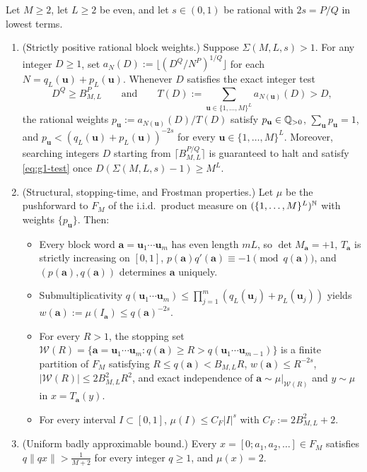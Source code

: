 \documentclass[11pt]{article}
\newcommand{\dist}[1]{\lVert #1\rVert}
\begin{document}
\begin{lemma}\label{lem:block-measure}
Let $M\ge2$, let $L\ge2$ be even, and let $s\in(0,1)$ be rational with $2s=P/Q$ in lowest terms.
\begin{enumerate}[label=\textup{(\arabic*)},nosep]
\item \textup{(Strictly positive rational block weights.)} Suppose $\Sigma(M,L,s)>1$. For any integer $D\ge1$, set $a_N(D):=\lfloor(D^Q/N^P)^{1/Q}\rfloor$ for each $N=q_L(\mathbf{u})+p_L(\mathbf{u})$. Whenever $D$ satisfies the exact integer test
\begin{equation}\label{eq:g1-test}
D^Q\ge B_{M,L}^P\qquad\text{and}\qquad T(D):=\sum_{\mathbf{u}\in\{1,\dots,M\}^L}a_{N(\mathbf{u})}(D)>D,
\end{equation}
the rational weights $p_{\mathbf{u}}:=a_{N(\mathbf{u})}(D)/T(D)$ satisfy $p_{\mathbf{u}}\in\mathbb Q_{>0}$, $\sum_{\mathbf{u}}p_{\mathbf{u}}=1$, and $p_{\mathbf{u}}<(q_L(\mathbf{u})+p_L(\mathbf{u}))^{-2s}$ for every $\mathbf{u}\in\{1,\dots,M\}^L$. Moreover, searching integers $D$ starting from $\lceil B_{M,L}^{P/Q}\rceil$ is guaranteed to halt and satisfy \eqref{eq:g1-test} once $D(\Sigma(M,L,s)-1)\ge M^L$.
\item \textup{(Structural, stopping-time, and Frostman properties.)} Let $\mu$ be the pushforward to $F_M$ of the i.i.d.\ product measure on $(\{1,\dots,M\}^L)^{\mathbb N}$ with weights $\{p_{\mathbf{u}}\}$. Then:
\begin{itemize}[nosep]
\item Every block word $\mathbf{a}=\mathbf{u}_1\cdots\mathbf{u}_m$ has even length $mL$, so $\det M_{\mathbf{a}}=+1$, $T_{\mathbf{a}}$ is strictly increasing on $[0,1]$, $p(\mathbf{a})q'(\mathbf{a})\equiv-1\pmod{q(\mathbf{a})}$, and $(p(\mathbf{a}),q(\mathbf{a}))$ determines $\mathbf{a}$ uniquely.
\item Submultiplicativity $q(\mathbf{u}_1\cdots\mathbf{u}_m)\le\prod_{j=1}^m(q_L(\mathbf{u}_j)+p_L(\mathbf{u}_j))$ yields $w(\mathbf{a}):=\mu(I_{\mathbf{a}})\le q(\mathbf{a})^{-2s}$.
\item For every $R>1$, the stopping set $\mathcal{W}(R)=\{\mathbf{a}=\mathbf{u}_1\cdots\mathbf{u}_m:q(\mathbf{a})\ge R>q(\mathbf{u}_1\cdots\mathbf{u}_{m-1})\}$ is a finite partition of $F_M$ satisfying $R\le q(\mathbf{a})<B_{M,L}R$, $w(\mathbf{a})\le R^{-2s}$, $|\mathcal{W}(R)|\le 2B_{M,L}^2R^2$, and exact independence of $\mathbf{a}\sim\mu|_{\mathcal{W}(R)}$ and $y\sim\mu$ in $x=T_{\mathbf{a}}(y)$.
\item For every interval $I\subset[0,1]$, $\mu(I)\le C_F|I|^s$ with $C_F:=2B_{M,L}^2+2$.
\end{itemize}
\item \textup{(Uniform badly approximable bound.)} Every $x=[0;a_1,a_2,\dots]\in F_M$ satisfies $q\dist{qx}>\frac{1}{M+2}$ for every integer $q\ge1$, and $\mu(x)=2$.
\end{enumerate}
\end{lemma}
\end{document}
